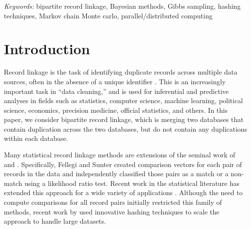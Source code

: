 \documentclass[12pt,letterpaper]{article}
\newcommand{\1}[1]{\mathbb{I}\!\left[#1\right]} %
\def\spacingset#1{\renewcommand{\baselinestretch}%
  {#1}\small\normalsize} \spacingset{1}
\begin{document}
\noindent%
{\it Keywords:} bipartite record linkage, Bayesian methods, Gibbs sampling, hashing techniques, Markov chain Monte carlo, parallel/distributed computing

\newpage
\spacingset{1.5}

\section{Introduction}
\label{sec:introduction}
	
%	
%	
%	
	

	
	Record linkage is the task of identifying duplicate records across multiple data sources, often in the absence of a unique identifier \citep{christen_2012}. This is an increasingly important task in ``data cleaning,'' and is used for inferential and predictive analyses in fields such as statistics, computer science, machine learning, political science, economics, precision medicine, official statistics, and others. In this paper, we consider bipartite record linkage, which is merging two databases that contain duplication across the two databases, but do not contain any duplications within each database. 
	
	
	Many statistical record linkage methods are extensions of the seminal work of \cite{fellegi_theory_1969} and \cite{newcombe_automatic_1959}. Specifically, Fellegi and Sunter created comparison vectors for each pair of records in the data and independently classified those pairs as a match or a non-match using a likelihood ratio test. Recent work in the statistical literature has extended this approach for a wide variety of applications \citep{winkler1991application, fair2004generalized, wagner2014person, gill2003english}. Although the need to compute comparisons for all record pairs initially restricted this family of methods, recent work by \cite{enamorado2019using} used innovative hashing techniques to scale the approach to handle large datasets.
	
\end{document}
